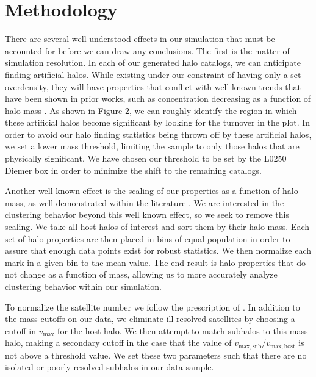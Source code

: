\documentclass[usenatbib,usegraphicx,letterpaper]{mn2e}
\begin{document}
\section[]{Methodology}
\label{section:methodology}

There are several well understood effects in our simulation that must be accounted for before we can draw any conclusions. The first is the matter of simulation resolution. In each of our generated halo catalogs, we can anticipate finding artificial halos. While existing under our constraint of having only a set overdensity, they will have properties that conflict with well known trends that have been shown in prior works, such as concentration decreasing as a function of halo mass \citep{wechsler06}. As shown in Figure 2, we can roughly identify the region in which these artificial halos become significant by looking for the turnover in the plot. In order to avoid our halo finding statistics being thrown off by these artificial halos, we set a lower mass threshold, limiting the sample to only those halos that are physically significant. We have chosen our threshold to be set by the L0250 Diemer box in order to minimize the shift to the remaining catalogs.


Another well known effect is the scaling of our properties as a function of halo mass, as well demonstrated within the literature \citep{duffy08}. We are interested in the clustering behavior beyond this well known effect, so we seek to remove this scaling. We take all host halos of interest and sort them by their halo mass. Each set of halo properties are then placed in bins of equal population in order to assure that enough data points exist for robust statistics. We then normalize each mark in a given bin to the mean value. The end result is halo properties that do not change as a function of mass, allowing us to more accurately analyze clustering behavior within our simulation.

To normalize the satellite number we follow the prescription of \citet{wechsler06}. In addition to the mass cutoffs on our data, we eliminate ill-resolved satellites by choosing a cutoff in $v_{\mathrm{max}}$ for the host halo. We then attempt to match subhalos to this mass halo, making a secondary cutoff in the case that the value of $v_{\mathrm{max,sub}} / v_{\mathrm{max,host}}$ is not above a threshold value. We set these two parameters such that there are no isolated or poorly resolved subhalos in our data sample.
\end{document}
